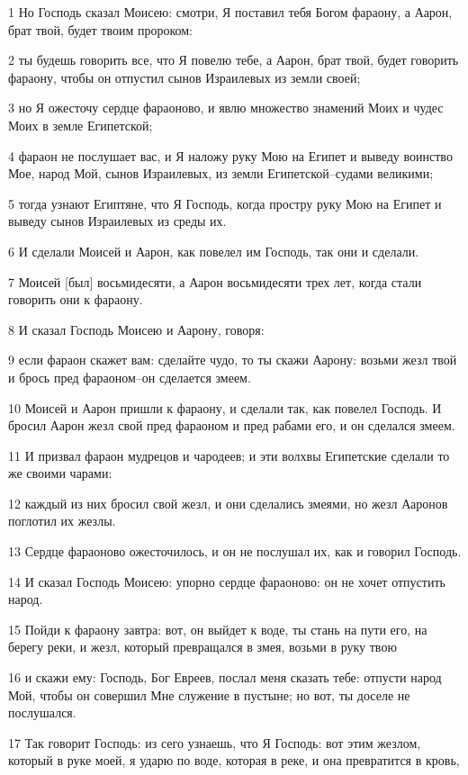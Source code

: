 \par 1 Но Господь сказал Моисею: смотри, Я поставил тебя Богом фараону, а Аарон, брат твой, будет твоим пророком:
\par 2 ты будешь говорить все, что Я повелю тебе, а Аарон, брат твой, будет говорить фараону, чтобы он отпустил сынов Израилевых из земли своей;
\par 3 но Я ожесточу сердце фараоново, и явлю множество знамений Моих и чудес Моих в земле Египетской;
\par 4 фараон не послушает вас, и Я наложу руку Мою на Египет и выведу воинство Мое, народ Мой, сынов Израилевых, из земли Египетской--судами великими;
\par 5 тогда узнают Египтяне, что Я Господь, когда простру руку Мою на Египет и выведу сынов Израилевых из среды их.
\par 6 И сделали Моисей и Аарон, как повелел им Господь, так они и сделали.
\par 7 Моисей [был] восьмидесяти, а Аарон восьмидесяти трех лет, когда стали говорить они к фараону.
\par 8 И сказал Господь Моисею и Аарону, говоря:
\par 9 если фараон скажет вам: сделайте чудо, то ты скажи Аарону: возьми жезл твой и брось пред фараоном--он сделается змеем.
\par 10 Моисей и Аарон пришли к фараону, и сделали так, как повелел Господь. И бросил Аарон жезл свой пред фараоном и пред рабами его, и он сделался змеем.
\par 11 И призвал фараон мудрецов и чародеев; и эти волхвы Египетские сделали то же своими чарами:
\par 12 каждый из них бросил свой жезл, и они сделались змеями, но жезл Ааронов поглотил их жезлы.
\par 13 Сердце фараоново ожесточилось, и он не послушал их, как и говорил Господь.
\par 14 И сказал Господь Моисею: упорно сердце фараоново: он не хочет отпустить народ.
\par 15 Пойди к фараону завтра: вот, он выйдет к воде, ты стань на пути его, на берегу реки, и жезл, который превращался в змея, возьми в руку твою
\par 16 и скажи ему: Господь, Бог Евреев, послал меня сказать тебе: отпусти народ Мой, чтобы он совершил Мне служение в пустыне; но вот, ты доселе не послушался.
\par 17 Так говорит Господь: из сего узнаешь, что Я Господь: вот этим жезлом, который в руке моей, я ударю по воде, которая в реке, и она превратится в кровь,
